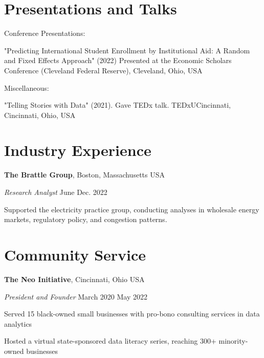 \documentclass[margin,line]{res}
\newenvironment{list1}{
  \begin{list}{\ding{113}}{%
      \setlength{\itemsep}{0in}
      \setlength{\parsep}{0in} \setlength{\parskip}{0in}
      \setlength{\topsep}{0in} \setlength{\partopsep}{0in} 
      \setlength{\leftmargin}{0.17in}}}{\end{list}}
\begin{document}
\begin{resume}
\section{\sc Presentations and Talks}
Conference Presentations:
\begin{list1}
\item[\cdot] "Predicting International Student Enrollment by Institutional Aid: A Random and Fixed Effects Approach" (2022) Presented at the Economic Scholars Conference (Cleveland Federal Reserve), Cleveland, Ohio, USA
\end{list1}

Miscellaneous:
\begin{list1}
\item[\cdot] "Telling Stories with Data" (2021). Gave TEDx talk. TEDxUCincinnati, Cincinnati, Ohio, USA 
\end{list1}


\section{\sc Industry Experience}
{\bf The Brattle Group}, Boston, Massachusetts USA

\vspace{-.3cm}
{\em Research Analyst} \hfill {June{ \textemdash } Dec. 2022}\\
\vspace{-.4cm}
\begin{list1}
\item[\cdot] Supported the electricity practice group, conducting analyses in wholesale energy markets, regulatory policy, and congestion patterns. 
\end{list1}

\section{\sc Community Service}
{\bf The Neo Initiative}, Cincinnati, Ohio USA

\vspace{-.3cm}
{\em President and Founder} \hfill {March 2020 { \textemdash } May 2022} \\
\vspace{-.4cm}
\begin{list1}
\item[\cdot] Served 15 black-owned small businesses with pro-bono consulting services in data analytics
\item[\cdot] Hosted a virtual state-sponsored data literacy series, reaching 300+ minority-owned businesses
\end{list1}


\end{resume}
\end{document}
